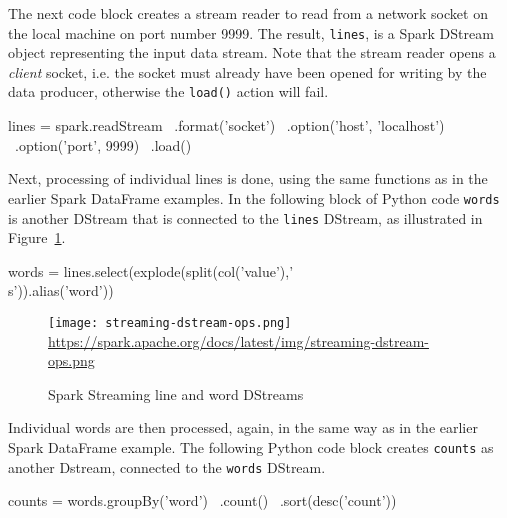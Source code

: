 The next code block creates a stream reader to read from a network socket on the local machine on port number 9999. The result, \texttt{lines}, is a Spark DStream object representing the input data stream. Note that the stream reader opens a \emph{client} socket, i.e. the socket must already have been opened for writing by the data producer, otherwise the \texttt{load()} action will fail.

\begin{samepage}
\begin{pythoncode}
lines = spark.readStream \
             .format('socket') \
             .option('host', 'localhost') \
             .option('port', 9999) \
             .load()
\end{pythoncode}
\end{samepage}

Next, processing of individual lines is done, using the same functions as in the earlier Spark DataFrame examples. In the following block of Python code \texttt{words} is another DStream that is connected to the \texttt{lines} DStream, as illustrated in Figure~\ref{fig:sparkwordcount}.

\begin{samepage}
\begin{pythoncode}
words = lines.select(explode(split(col('value'),'\\s')).alias('word'))
\end{pythoncode}
\end{samepage}

\begin{figure}
\centering

\texttt{[image: streaming-dstream-ops.png]}
\scriptsize\url{https://spark.apache.org/docs/latest/img/streaming-dstream-ops.png}\normalsize
\caption{Spark Streaming line and word DStreams}
\label{fig:sparkwordcount}
\end{figure}

Individual words are then processed, again, in the same way as in the earlier Spark DataFrame example. The following Python code block creates \texttt{counts} as another Dstream, connected to the \texttt{words} DStream.

\begin{samepage}
\begin{pythoncode}
counts = words.groupBy('word') \
              .count() \
              .sort(desc('count'))
\end{pythoncode}
\end{samepage}

